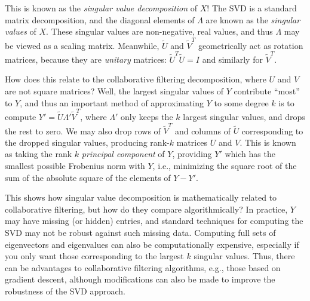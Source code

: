 This is known as the {\em singular value decomposition} of $X$!  The
SVD is a standard matrix decomposition, and the diagonal elements of
$\Lambda$ are known as the {\em singular values} of $X$.  These
singular values are non-negative, real values, and thus $\Lambda$ may
be viewed as a scaling matrix.  Meanwhile, $\tilde{U}$ and $\tilde{V}^T$ geometrically
act as rotation matrices, because they are {\em unitary} matrices:
$\tilde{U}^T \tilde{U} = I$ and similarly for $\tilde{V}^T$.

How does this relate to the collaborative filtering decomposition,
where $U$ and $V$ are not square matrices?  Well, the largest singular
values of $Y$ contribute ``most'' to $Y$, and thus an important method
of approximating $Y$ to some degree $k$ is to compute $Y' = \tilde{U}
\Lambda' \tilde{V}^T$, where $\Lambda'$ only keeps the $k$ largest
singular values, and drops the rest to zero.  We may also drop rows of
$\tilde{V}^T$ and columns of $\tilde{U}$ corresponding to the dropped
singular values, producing rank-$k$ matrices $U$ and $V$.  This is
known as taking the rank $k$ {\em principal component} of $Y$,
providing $Y'$ which has the smallest possible Frobenius norm with
$Y$, i.e., minimizing the square root of the sum of the absolute square
of the elements of $Y-Y'$.

This shows how singular value decomposition is mathematically related
to collaborative filtering, but how do they compare algorithmically?
In practice, $Y$ may have missing (or hidden) entries, and standard
techniques for computing the SVD may not be robust against such
missing data.  Computing full sets of eigenvectors and eigenvalues can
also be computationally expensive, especially if you only want those
corresponding to the largest $k$ singular values.  Thus, there can be
advantages to collaborative filtering algorithms, e.g., those based on
gradient descent, although modifications can also be made to improve
the robustness of the SVD approach.
